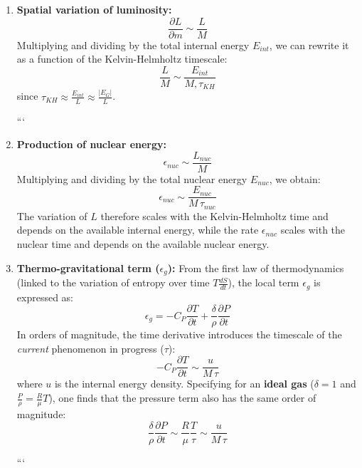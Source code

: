 \begin{enumerate}
\item \textbf{Spatial variation of luminosity:}
\begin{equation}
\frac{\partial L}{\partial m} \sim \frac{L}{M}
\end{equation}
Multiplying and dividing by the total internal energy $E_{int}$, we can rewrite it as a function of the Kelvin-Helmholtz timescale:
\begin{equation}
\frac{L}{M} \sim \frac{E_{int}}{M , \tau_{KH}}
\end{equation}
since $\tau_{KH} \approx \frac{E_{int}}{L} \approx \frac{\vert{}E_G\vert{}}{L}$.

```
\item \textbf{Production of nuclear energy:}
\begin{equation}
\epsilon_{nuc} \sim \frac{L_{nuc}}{M}
\end{equation}
Multiplying and dividing by the total nuclear energy $E_{nuc}$, we obtain:
\begin{equation}
\epsilon_{nuc} \sim \frac{E_{nuc}}{M \, \tau_{nuc}}
\end{equation}
The variation of $L$ therefore scales with the Kelvin-Helmholtz time and depends on the available internal energy, while the rate $\epsilon_{nuc}$ scales with the nuclear time and depends on the available nuclear energy.

\item \textbf{Thermo-gravitational term ($\epsilon_g$):}
From the first law of thermodynamics (linked to the variation of entropy over time $T \frac{dS}{dt}$), the local term $\epsilon_g$ is expressed as:
\begin{equation}
\epsilon_g = -C_P \frac{\partial T}{\partial t} + \frac{\delta}{\rho} \frac{\partial P}{\partial t}
\end{equation}
In orders of magnitude, the time derivative introduces the timescale of the \textit{current} phenomenon in progress ($\tau$):
\begin{equation}
-C_P \frac{\partial T}{\partial t} \sim \frac{u}{M \, \tau}
\end{equation}
where $u$ is the internal energy density. Specifying for an \textbf{ideal gas} ($\delta = 1$ and $\frac{P}{\rho} = \frac{R}{\mu} T$), one finds that the pressure term also has the same order of magnitude:
\begin{equation}
\frac{\delta}{\rho} \frac{\partial P}{\partial t} \sim \frac{R}{\mu} \frac{T}{\tau} \sim \frac{u}{M \, \tau}
\end{equation}


```

\end{enumerate}

